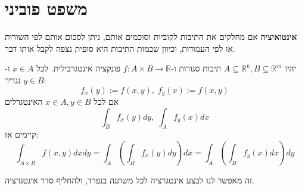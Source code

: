 \documentclass{tstextbook}
\begin{document}
\section{משפט פוביני}

\textbf{אינטואיציה} אם מחלקים את התיבות לקוביות וסוכמים אותם, ניתן לסכום אותם לפי השורות או לפי העמודות, וכיוון שכמות התיבות היא סופית נצפה לקבל אותו דבר.

\begin{theorem}[פוביני]
יהיו \(A\subseteq \mathbb{R}^k,B\subseteq \mathbb{R}^m\) תיבות סגורות ו-\(f:A\times B\to\mathbb{R}\) פונקציה אינטגרבילית. לכל \(x  \in A\) ו-\(y\in B\) נגדיר:
$$f_{x}(y):=f(x,y),\;f_{y}(x):=f(x,y)$$
אם לכל \(x \in A,y \in B\) האינטגרלים$$\int_{B}f_{x}(y)d y,\;\int_{A}f_{y}(x)d x$$
קיימים אז:
$$\int_{A\times B}f(x,y)d x d y=\int_{A}\left( \int_{B}f_{x}(y)d y \right)d x=\int_{A}\left( \int_{B}f_{y}(x)d x \right)d y$$

\end{theorem}
זה מאפשר לנו לבצע אינטגרציה לכל משתנה בנפרד, ולהחליף סדר אינטגרציה.
\end{document}
